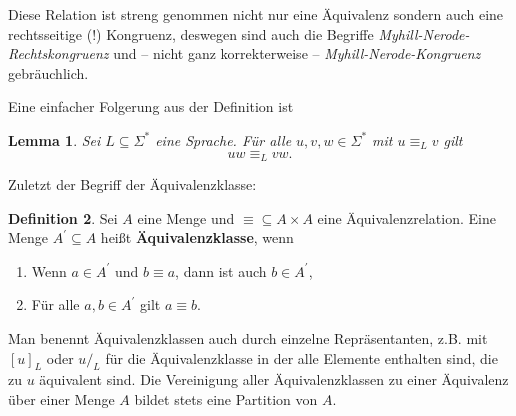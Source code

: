 \documentclass[11pt, a4paper]{article}
\theoremstyle{definition}
\newtheorem{definition}{Definition}
\theoremstyle{plain}
\newtheorem{lemma}[definition]{Lemma}
\begin{document}
Diese Relation ist streng genommen nicht nur eine Äquivalenz sondern auch eine rechtsseitige (!) Kongruenz, deswegen sind auch die Begriffe \textit{Myhill-Nerode-Rechtskongruenz} und -- nicht ganz korrekterweise -- \textit{Myhill-Nerode-Kongruenz} gebräuchlich.

Eine einfacher Folgerung aus der Definition ist
\begin{lemma}\label{kongruenzlemma}
	Sei \( L \subseteq \Sigma^\ast \) eine Sprache. Für alle \( u, v, w \in \Sigma^\ast \) mit \( u \equiv_L v \) gilt
	\[
		uw \equiv_L vw.
	\]
\end{lemma}

Zuletzt der Begriff der Äquivalenzklasse:
\begin{definition}
	Sei \( A \) eine Menge und \( \equiv \subseteq A \times A \) eine Äquivalenzrelation. Eine Menge \( A^\prime \subseteq A \) heißt \textbf{Äquivalenzklasse}, wenn
	\begin{enumerate}
		\item Wenn \( a \in A^\prime \) und \( b \equiv a \), dann ist auch \( b \in A^\prime \),
		\item Für alle \( a, b \in A^\prime \) gilt \( a \equiv b \).
	\end{enumerate}
\end{definition}

Man benennt Äquivalenzklassen auch durch einzelne Repräsentanten, z.B. mit \( [u]_L \) oder \( u/_L \) für die Äquivalenzklasse in der alle Elemente enthalten sind, die zu \( u \) äquivalent sind.
Die Vereinigung aller Äquivalenzklassen zu einer Äquivalenz über einer Menge \( A \) bildet stets eine Partition von \( A \).
\end{document}

